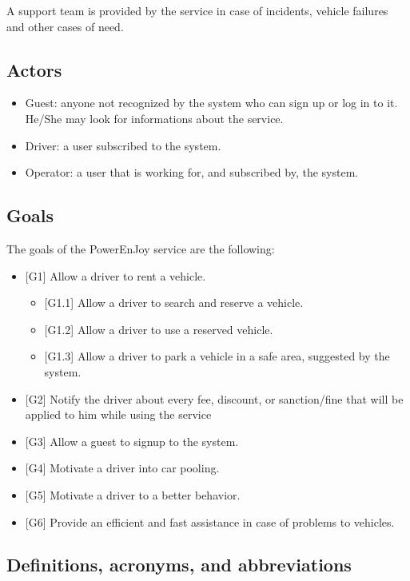 A support team is provided by the service in case of incidents, vehicle failures and other cases of need.

\subsection{Actors}
\begin{itemize}
	\item Guest: anyone not recognized by the system who can sign up or log in to it. He/She may look for informations about the service.
	\item Driver: a user subscribed to the system.
	\item Operator: a user that is working for, and subscribed by, the system.
\end{itemize}

\subsection{Goals}
The goals of the PowerEnJoy service are the following:
\begin{itemize}
	\item {[G1]} Allow a driver to rent a vehicle.
	\begin{itemize}
		\item {[G1.1]} Allow a driver to search and reserve a vehicle.
		\item {[G1.2]} Allow a driver to use a reserved vehicle.
		\item {[G1.3]} Allow a driver to park a vehicle in a safe area, suggested by the system.
	\end{itemize}
	\item {[G2]} Notify the driver about every fee, discount, or sanction/fine that will be applied to him while using the service
	\item {[G3]} Allow a guest to signup to the system.
	\item {[G4]} Motivate a driver into car pooling.
	\item {[G5]} Motivate a driver to a better behavior.
	\item {[G6]} Provide an efficient and fast assistance in case of problems to vehicles.
\end{itemize}

\subsection{Definitions, acronyms, and abbreviations}

